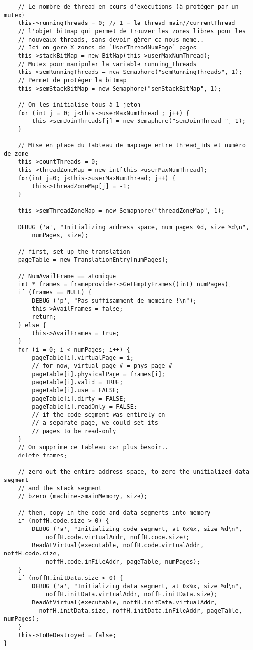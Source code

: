 \documentclass[a4paper,10pt]{article}
\begin{document}
\begin{lstlisting}
    // Le nombre de thread en cours d'executions (à protéger par un mutex)
    this->runningThreads = 0; // 1 = le thread main//currentThread
    // l'objet bitmap qui permet de trouver les zones libres pour les
    // nouveaux threads, sans devoir gérer ça nous meme..
    // Ici on gere X zones de `UserThreadNumPage` pages
    this->stackBitMap = new BitMap(this->userMaxNumThread);
    // Mutex pour manipuler la variable running_threads
    this->semRunningThreads = new Semaphore("semRunningThreads", 1);
    // Permet de protéger la bitmap
    this->semStackBitMap = new Semaphore("semStackBitMap", 1);

    // On les initialise tous à 1 jeton
    for (int j = 0; j<this->userMaxNumThread ; j++) {
        this->semJoinThreads[j] = new Semaphore("semJoinThread ", 1);
    }

    // Mise en place du tableau de mappage entre thread_ids et numéro de zone
    this->countThreads = 0;
    this->threadZoneMap = new int[this->userMaxNumThread];
    for(int j=0; j<this->userMaxNumThread; j++) {
        this->threadZoneMap[j] = -1;
    }

    this->semThreadZoneMap = new Semaphore("threadZoneMap", 1);

    DEBUG ('a', "Initializing address space, num pages %d, size %d\n",
        numPages, size);

    // first, set up the translation
    pageTable = new TranslationEntry[numPages];

    // NumAvailFrame == atomique
    int * frames = frameprovider->GetEmptyFrames((int) numPages);
    if (frames == NULL) {
        DEBUG ('p', "Pas suffisamment de memoire !\n");
        this->AvailFrames = false;
        return;
    } else {
        this->AvailFrames = true;
    }
    for (i = 0; i < numPages; i++) {
        pageTable[i].virtualPage = i;
        // for now, virtual page # = phys page #
        pageTable[i].physicalPage = frames[i];
        pageTable[i].valid = TRUE;
        pageTable[i].use = FALSE;
        pageTable[i].dirty = FALSE;
        pageTable[i].readOnly = FALSE;
        // if the code segment was entirely on
        // a separate page, we could set its
        // pages to be read-only
    }
    // On supprime ce tableau car plus besoin..
    delete frames;

    // zero out the entire address space, to zero the unitialized data segment
    // and the stack segment
    // bzero (machine->mainMemory, size);

    // then, copy in the code and data segments into memory
    if (noffH.code.size > 0) {
        DEBUG ('a', "Initializing code segment, at 0x%x, size %d\n",
            noffH.code.virtualAddr, noffH.code.size);
        ReadAtVirtual(executable, noffH.code.virtualAddr, noffH.code.size,
            noffH.code.inFileAddr, pageTable, numPages);
    }
    if (noffH.initData.size > 0) {
        DEBUG ('a', "Initializing data segment, at 0x%x, size %d\n",
            noffH.initData.virtualAddr, noffH.initData.size);
        ReadAtVirtual(executable, noffH.initData.virtualAddr,
          noffH.initData.size, noffH.initData.inFileAddr, pageTable, numPages);
    }
    this->ToBeDestroyed = false;
}


\end{lstlisting}
\end{document}
